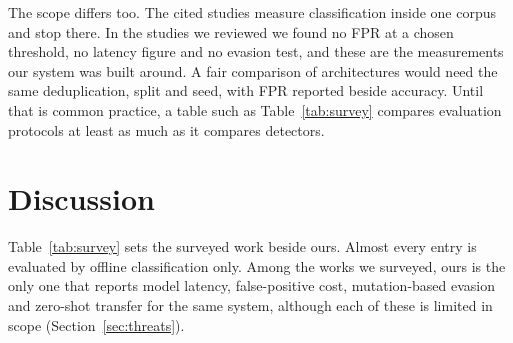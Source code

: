 \documentclass[preprint,11pt]{elsarticle}
\begin{document}
The scope differs too. The cited studies measure classification inside one
corpus and stop there. In the studies we reviewed we found no FPR at a
chosen threshold, no latency figure and no evasion test, and these are the
measurements our system was built around. A fair comparison of
architectures would need the same deduplication, split and seed, with FPR
reported beside accuracy. Until that is common practice, a table such as
Table~\ref{tab:survey} compares evaluation protocols at least as much as it
compares detectors.


\section{Discussion}
\label{sec:discussion}
Table~\ref{tab:survey} sets the surveyed work beside ours. Almost every
entry is evaluated by offline classification only. Among the works we
surveyed, ours is the only one that reports model latency, false-positive
cost, mutation-based evasion and zero-shot transfer for the same system,
although each of these is limited in scope (Section~\ref{sec:threats}).
\end{document}
